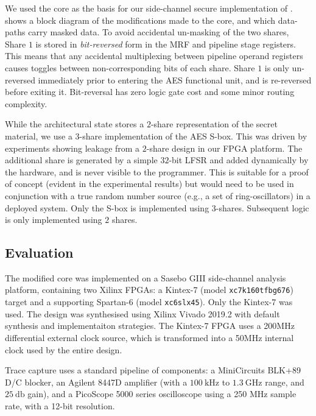 We used the  core as the basis for our side-channel secure
implementation of .
 shows a block diagram of the modifications
made to the core, and which data-paths carry masked data.
To avoid accidental un-masking of the two shares,
Share $1$ is stored in {\em bit-reversed} form in the MRF and pipeline
stage registers.
This means that any accidental multiplexing between pipeline operand
registers causes toggles between non-corresponding bits of each share.
Share $1$ is only un-reversed immediately prior to entering the
AES functional unit, and is re-reversed before exiting it.
Bit-reversal has zero logic gate cost and some minor routing complexity.

While the architectural state stores a $2$-share representation
of the secret material, we use a $3$-share implementation of the
AES S-box.
This was driven by experiments showing 
leakage from a $2$-share design in our FPGA platform.
The additional share is generated by a simple $32$-bit LFSR and added
dynamically by the hardware, and is never visible to the programmer.
This is suitable for a proof of concept (evident in the experimental
results) but would need to be used in conjunction with a true random
number source (e.g., a set of ring-oscillators) in a deployed system.
Only the S-box is implemented using $3$-shares.
Subsequent  logic is only implemented using $2$ shares.

\subsection{Evaluation}

The modified  core was implemented on a
Sasebo GIII \cite{HKSS:12}
side-channel analysis platform, containing two Xilinx FPGAs:
a Kintex-7 
(model {\tt xc7k160tfbg676})
target
and
a supporting Spartan-6
(model {\tt xc6slx45}).
Only the Kintex-7 was used.
The design was synthesised using Xilinx Vivado 2019.2 with
default synthesis and implementaiton strategies.
The Kintex-7 FPGA uses a 200MHz differential external clock source, which is
transformed into a 50MHz internal clock used by the entire design.

Trace capture uses a standard pipeline of components:
a MiniCircuits BLK+89 D/C blocker,
an Agilent 8447D amplifier (with a $\SI{100}{\kilo\hertz}$ to $\SI{1.3}{\giga\hertz}$ range, and $\SI{25}{\decibel}$ gain),
and
a  PicoScope 5000 series oscilloscope using a
250 MHz sample rate, with a 12-bit resolution.

